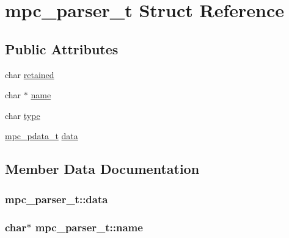 \hypertarget{structmpc__parser__t}{}\section{mpc\+\_\+parser\+\_\+t Struct Reference}
\label{structmpc__parser__t}
\subsection*{Public Attributes}
\begin{DoxyCompactItemize}
\item 
char \hyperlink{structmpc__parser__t_ac4673f0e9bd1a7f26afca3a08c1e3a59}{retained}
\item 
char $\ast$ \hyperlink{structmpc__parser__t_a7a1a3bc815d6ede81808e39cba33c104}{name}
\item 
char \hyperlink{structmpc__parser__t_ae8dc350baf8b9393420108c7fd1f3835}{type}
\item 
\hyperlink{unionmpc__pdata__t}{mpc\+\_\+pdata\+\_\+t} \hyperlink{structmpc__parser__t_a74e4d73d35d64f05ac2c4e1546237c6d}{data}
\end{DoxyCompactItemize}


\subsection{Member Data Documentation}
\hypertarget{structmpc__parser__t_a74e4d73d35d64f05ac2c4e1546237c6d}{}
\subsubsection[{data}]{ mpc\+\_\+parser\+\_\+t\+::data}\label{structmpc__parser__t_a74e4d73d35d64f05ac2c4e1546237c6d}
\hypertarget{structmpc__parser__t_a7a1a3bc815d6ede81808e39cba33c104}{}
\subsubsection[{name}]{\setlength{\rightskip}{0pt plus 5cm}char$\ast$ mpc\+\_\+parser\+\_\+t\+::name}\label{structmpc__parser__t_a7a1a3bc815d6ede81808e39cba33c104}
\hypertarget{structmpc__parser__t_ac4673f0e9bd1a7f26afca3a08c1e3a59}{}
